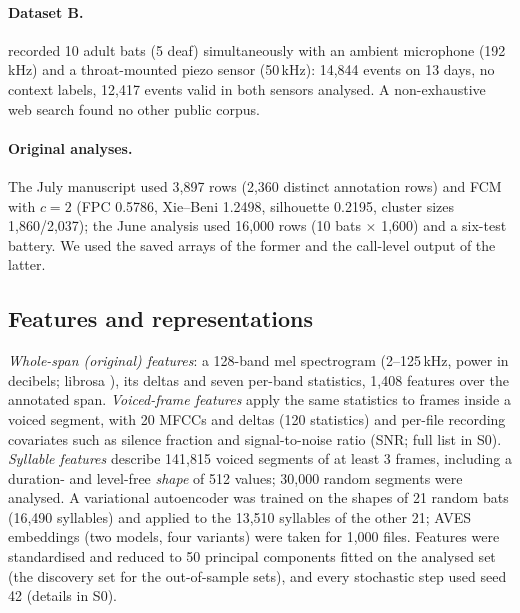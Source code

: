 \paragraph{Dataset B.} \citet{elie2024} recorded 10 adult bats (5 deaf) simultaneously with an ambient microphone (192\,kHz) and a throat-mounted piezo sensor (50\,kHz): 14,844 events on 13 days, no context labels, 12,417 events valid in both sensors analysed. A non-exhaustive web search found no other public corpus.

\paragraph{Original analyses.} The July manuscript used 3,897 rows (2,360 distinct annotation rows) and FCM with $c=2$ (FPC 0.5786, Xie--Beni 1.2498, silhouette 0.2195, cluster sizes 1,860/2,037); the June analysis used 16,000 rows (10 bats $\times$ 1,600) and a six-test battery. We used the saved arrays of the former and the call-level output of the latter.

\subsection{Features and representations}
\emph{Whole-span (original) features}: a 128-band mel spectrogram (2--125\,kHz, power in decibels; librosa \cite{mcfee2015}), its deltas and seven per-band statistics, 1,408 features over the annotated span. \emph{Voiced-frame features} apply the same statistics to frames inside a voiced segment, with 20 MFCCs and deltas (120 statistics) and per-file recording covariates such as silence fraction and signal-to-noise ratio (SNR; full list in S0). \emph{Syllable features} describe 141,815 voiced segments of at least 3 frames, including a duration- and level-free \emph{shape} of 512 values; 30,000 random segments were analysed. A variational autoencoder \cite{goffinet2021} was trained on the shapes of 21 random bats (16,490 syllables) and applied to the 13,510 syllables of the other 21; AVES embeddings \cite{aves2023} (two models, four variants) were taken for 1,000 files. Features were standardised and reduced to 50 principal components fitted on the analysed set (the discovery set for the out-of-sample sets), and every stochastic step used seed 42 (details in S0).

